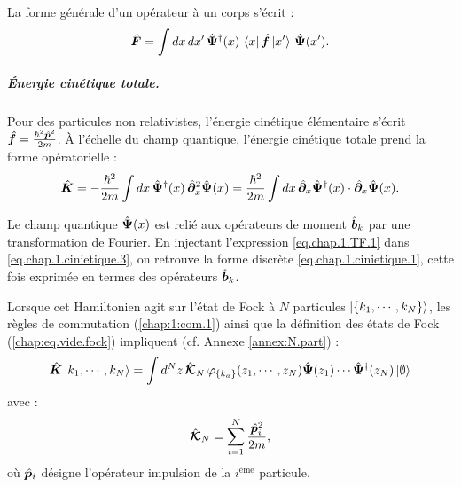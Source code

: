 La forme générale d’un opérateur à un corps s’écrit :
\begin{eqnarray}
\hat{\bm{F}} = \int dx \, dx' \, \hat{\bm{\Psi}}^\dagger(x) \, \bra{ x} \hat{\bm{f}} \ket{x'} \, \hat{\bm{\Psi}}(x').
\end{eqnarray}%
\begin{mdframed}[
	linewidth=0.5pt, 
	backgroundcolor=gray!5, 
	roundcorner=50pt,	
	innerleftmargin=5pt,
    innerrightmargin=5pt,
    innertopmargin=-10pt,
    innerbottommargin=2pt,
    leftmargin=2pt,
    rightmargin=2pt
]
\subparagraph{Énergie cinétique totale.}

Pour des particules non relativistes, l’énergie cinétique élémentaire s’écrit $\hat{\bm{f}} = \frac{\hbar^2 \hat{\bm{p}}^2}{2m}$. À l’échelle du champ quantique, l’énergie cinétique totale prend la forme opératorielle :
\begin{eqnarray}
\hat{\bm{K}} =  -\frac{\hbar^2}{2m} \int dx \, \hat{\bm{\Psi}}^\dagger(x) \, \hat{\bm{\partial}}_x^2 \hat{\bm{\Psi}}(x)
= \frac{\hbar^2}{2m} \int dx \, \hat{\bm{\partial}}_x \hat{\bm{\Psi}}^\dagger(x) \cdot \hat{\bm{\partial}}_x \hat{\bm{\Psi}}(x). \label{eq.chap.1.cinietique.3}
\end{eqnarray}

Le champ quantique $\hat{\bm{\Psi}}(x)$ est relié aux opérateurs de moment $\hat{\bm{b}}_k$ par une transformation de Fourier. En injectant l'expression \eqref{eq.chap.1.TF.1} dans \eqref{eq.chap.1.cinietique.3}, on retrouve la forme discrète \eqref{eq.chap.1.cinietique.1}, cette fois exprimée en termes des opérateurs $\hat{\bm{b}}_k$.

Lorsque cet Hamiltonien agit sur l’état de Fock à $N$ particules $\ket{\{k_1 , \cdots , k_N\}}$, les règles de commutation (\ref{chap:1:com.1}) ainsi que la définition des états de Fock (\ref{chap:eq.vide.fock}) impliquent (cf. Annexe \ref{annex:N.part}) :
\begin{eqnarray}
\hat{\bm{K}}\ket{k_1 , \cdots , k_N } =  \int d^N z \, \hat{\bm{\mathcal{K}}}_N \, \varphi_{\{k_a\}}(z_1 , \cdots , z_N ) \hat{\bm{\Psi}}(z_1) \cdots \hat{\bm{\Psi}}^\dag(z_N) \ket{\emptyset}
\end{eqnarray}
avec :
\[
	\hat{\bm{\mathcal{K}}}_N = \sum_{i=1}^N \frac{\hat{\bm{p}}_i^2}{2m},
\]
où \( \hat{\bm{p}}_i \) désigne l’opérateur impulsion de la \( i^\text{ème} \) particule.
\end{mdframed}




